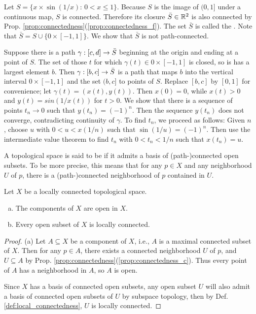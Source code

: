 \documentclass[11pt,a4paper]{article}
\begin{document}
\begin{example}
Let $S = \{x\times \sin{(1/x)}:\,0<x\le 1\}$. Because $S$ is the image of $(0,1]$ under a continuous map, $S$ is connected. Therefore its closure $\bar{S}\in \mathbb{R}^2$ is also connected by Prop. \ref{prop:connectedness}(\ref{prop:connectedness_f}). The set $\bar{S}$ is called the . Note that $\bar{S} = S\cup \{0\times [-1,1]\}$. We show that $\bar{S}$ is not path-connected. 

Suppose there is a path $\gamma:[c,d]\rightarrow \bar{S}$ beginning at the origin and ending at a point of $S$. The set of those $t$ for which $\gamma(t)\in 0\times[-1,1]$ is closed, so is has a largest element $b$. Then $\gamma:[b,c]\rightarrow \bar{S}$ is a path that maps $b$ into the vertical interval $0\times [-1,1]$ and the set $(b,c]$ to points of $S$. Replace $[b,c]$ by $[0,1]$ for convenience; let $\gamma(t) = (x(t),y(t))$. Then $x(0) = 0$, while $x(t)>0$ and $y(t) = sin(1/x(t))$ for $t>0$. We show that there is a sequence of points $t_n\rightarrow 0$ such that $y(t_n) = (-1)^n$. Then the sequence $y(t_n)$ does not converge, contradicting continuity of $\gamma$. To find $t_n$, we proceed as follows: Given $n$, choose $u$ with $0<u<x(1/n)$ such that $\sin{(1/u)}=(-1)^n$. Then use the intermediate value theorem to find $t_n$ with $0<t_n<1/n$ such that $x(t_n) = u$.
\end{example}

\begin{definition}\label{def:local_connectedness}
A topological space is said to be  if it admits a basis of (path-)connected open subsets. To be more precise, this means that for any $p\in X$ and any neighborhood $U$ of $p$, there is a (path-)connected neighborhood of $p$ contained in $U$.
\end{definition}

\begin{proposition}
Let $X$ be a locally connected topological space.
\begin{enumerate}[(a)]
    \item The components of $X$ are open in $X$.
    \item Every open subset of $X$ is locally connected.
\end{enumerate}
\end{proposition}

\begin{proof}
{(a)} Let $A\subseteq X$ be a component of $X$, i.e., $A$ is a maximal connected subset of $X$. Then for any $p\in A$, there exists a connected neighborhood $U$ of $p$, and $U\subseteq A$ by Prop. \ref{prop:connectedness}(\ref{prop:connectedness_c}). Thus every point of $A$ has a neighborhood in $A$, so $A$ is open.

 Since $X$ has a basis of connected open subsets, any open subset $U$ will also admit a basis of connected open subsets of $U$ by subspace topology, then by Def. \ref{def:local_connectedness}, $U$ is locally connected.
\end{proof}
\end{document}

